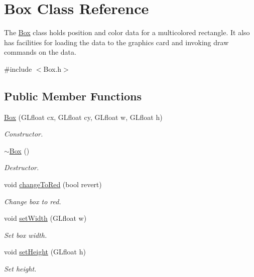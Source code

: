 \hypertarget{class_box}{}\section{Box Class Reference}
\label{class_box}


The \hyperlink{class_box}{Box} class holds position and color data for a multicolored rectangle. It also has facilities for loading the data to the graphics card and invoking draw commands on the data.  




{\ttfamily \#include $<$Box.\+h$>$}

\subsection*{Public Member Functions}
\begin{DoxyCompactItemize}
\item 
\hyperlink{class_box_a3840554e31c954ed115169c7ce5f3954}{Box} (G\+Lfloat cx, G\+Lfloat cy, G\+Lfloat w, G\+Lfloat h)
\begin{DoxyCompactList}\small\item\em Constructor. \end{DoxyCompactList}\item 
\hyperlink{class_box_a6a5e09398e85d602a046b429062fb9c2}{$\sim$\+Box} ()
\begin{DoxyCompactList}\small\item\em Destructor. \end{DoxyCompactList}\item 
void \hyperlink{class_box_ae3085bbd9ff85fc73fab17cc3cb921ac}{change\+To\+Red} (bool revert)
\begin{DoxyCompactList}\small\item\em Change box to red. \end{DoxyCompactList}\item 
void \hyperlink{class_box_a272734cc296e7b34a53efc6f06336b00}{set\+Width} (G\+Lfloat w)
\begin{DoxyCompactList}\small\item\em Set box width. \end{DoxyCompactList}\item 
void \hyperlink{class_box_ac5556af3ef01d51abbf22d98c6c5880c}{set\+Height} (G\+Lfloat h)
\begin{DoxyCompactList}\small\item\em Set height. \end{DoxyCompactList}\item 

\end{DoxyCompactItemize}
